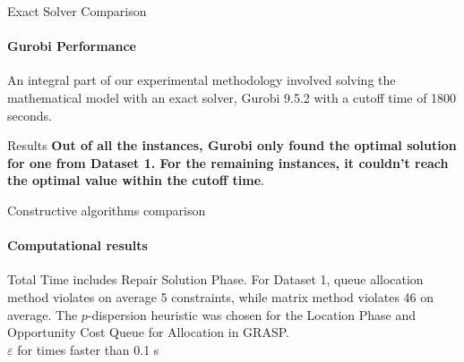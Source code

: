 \documentclass{beamer}
\begin{document}
\begin{frame}{Exact Solver Comparison}
    \framesubtitle{Gurobi Performance}

    An integral part of our experimental methodology involved solving the mathematical model with an exact solver, Gurobi 9.5.2 with a cutoff time of 1800 seconds. 

    \begin{block}{Results}
        \textbf{Out of all the instances, Gurobi only found the optimal solution for one from Dataset 1. For the remaining instances, it couldn't reach the optimal value within the cutoff time}.
    \end{block}

\end{frame}



\begin{frame}{Constructive algorithms comparison}
    \framesubtitle{Computational results}
\begin{table}
    \centering
    \caption{Constructive Heuristics Comparison of Averages.}
    \label{:comp}
\end{table}
    \small Total Time includes Repair Solution Phase. For Dataset 1, queue allocation method violates on average 5 constraints, while matrix method violates 46 on average. The $p$-dispersion heuristic was chosen for the Location Phase and Opportunity Cost Queue for Allocation in GRASP. 
    \\ \scriptsize $\varepsilon$ for times faster than 0.1 s
\end{frame}
\end{document}
